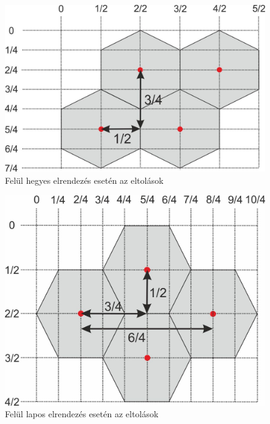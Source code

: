 \begin{figure}[h!]
\centering
\includegraphics[scale=1.2]{kepek/PointyTop.jpg}
\caption{Felül hegyes elrendezés esetén az eltolások}
\label{fig:PointyTop}
\end{figure}

\begin{figure}[h!]
\centering
\includegraphics[scale=1.2]{kepek/FlatTop.jpg}
\caption{Felül lapos elrendezés esetén az eltolások}
\label{fig:FlatTop}
\end{figure}
